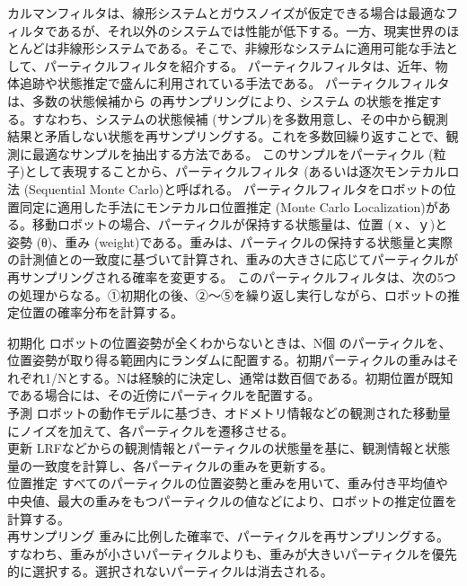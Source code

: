 カルマンフィルタは、線形システムとガウスノイズが仮定できる場合は最適なフィルタであるが、それ以外のシステムでは性能が低下する。一方、現実世界のほとんどは非線形システムである。そこで、非線形なシステムに適用可能な手法として、パーティクルフィルタを紹介する。
パーティクルフィルタは、近年、物体追跡や状態推定で盛んに利用されている手法である。 パーティクルフィルタは、多数の状態候補から  の再サンプリングにより、システム  の状態を推定する。すなわち、システムの状態候補 (サンプル)を多数用意し、その中から観測結果と矛盾しない状態を再サンプリングする。これを多数回繰り返すことで、観測に最適なサンプルを抽出する方法である。  このサンプルをパーティクル (粒子)として表現することから、パーティクルフィルタ (あるいは逐次モンテカルロ法 (Sequential Monte Carlo)と呼ばれる。
パーティクルフィルタをロボットの位置同定に適用した手法にモンテカルロ位置推定 (Monte Carlo Localization)がある。移動ロボットの場合、パーティクルが保持する状態量は、位置 (ｘ、ｙ)と姿勢 (θ)、重み (weight)である。重みは、パーティクルの保持する状態量と実際の計測値との一致度に基づいて計算され、重みの大きさに応じてパーティクルが再サンプリングされる確率を変更する。
このパーティクルフィルタは、次の5つの処理からなる。①初期化の後、②〜⑤を繰り返し実行しながら、ロボットの推定位置の確率分布を計算する。\\

\setcounter{num}{0}

\circled{\thenum} 初期化
ロボットの位置姿勢が全くわからないときは、N個  のパーティクルを、位置姿勢が取り得る範囲内にランダムに配置する。初期パーティクルの重みはそれぞれ1/Nとする。Nは経験的に決定し、通常は数百個である。初期位置が既知である場合には、その近傍にパーティクルを配置する。\\

\circled{\thenum} 予測
ロボットの動作モデルに基づき、オドメトリ情報などの観測された移動量にノイズを加えて、各パーティクルを遷移させる。\\

\circled{\thenum} 更新
LRFなどからの観測情報とパーティクルの状態量を基に、観測情報と状態量の一致度を計算し、各パーティクルの重みを更新する。\\

\circled{\thenum} 位置推定
すべてのパーティクルの位置姿勢と重みを用いて、重み付き平均値や中央値、最大の重みをもつパーティクルの値などにより、ロボットの推定位置を計算する。\\

\circled{\thenum} 再サンプリング
重みに比例した確率で、パーティクルを再サンプリングする。すなわち、重みが小さいパーティクルよりも、重みが大きいパーティクルを優先的に選択する。選択されないパーティクルは消去される。\\


